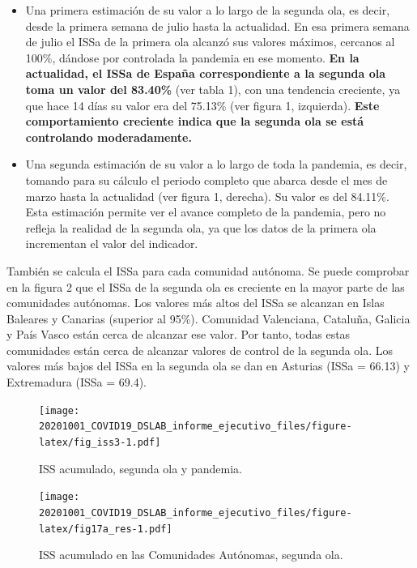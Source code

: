 \documentclass[
  11pt,
]{article}
\begin{document}
\begin{itemize}
\item
  Una primera estimación de su valor a lo largo de la segunda ola, es
  decir, desde la primera semana de julio hasta la actualidad. En esa
  primera semana de julio el ISSa de la primera ola alcanzó sus valores
  máximos, cercanos al 100\%, dándose por controlada la pandemia en ese
  momento. \textbf{En la actualidad, el ISSa de España correspondiente a
  la segunda ola toma un valor del 83.40\%} (ver tabla 1), con una
  tendencia creciente, ya que hace 14 días su valor era del 75.13\% (ver
  figura 1, izquierda). \textbf{Este comportamiento creciente indica que
  la segunda ola se está controlando moderadamente.}
\item
  Una segunda estimación de su valor a lo largo de toda la pandemia, es
  decir, tomando para su cálculo el periodo completo que abarca desde el
  mes de marzo hasta la actualidad (ver figura 1, derecha). Su valor es
  del 84.11\%. Esta estimación permite ver el avance completo de la
  pandemia, pero no refleja la realidad de la segunda ola, ya que los
  datos de la primera ola incrementan el valor del indicador.
\end{itemize}

También se calcula el ISSa para cada comunidad autónoma. Se puede
comprobar en la figura 2 que el ISSa de la segunda ola es creciente en
la mayor parte de las comunidades autónomas. Los valores más altos del
ISSa se alcanzan en Islas Baleares y Canarias (superior al 95\%).
Comunidad Valenciana, Cataluña, Galicia y País Vasco están cerca de
alcanzar ese valor. Por tanto, todas estas comunidades están cerca de
alcanzar valores de control de la segunda ola. Los valores más bajos del
ISSa en la segunda ola se dan en Asturias (ISSa = 66.13) y Extremadura
(ISSa = 69.4).

\begin{figure}
\centering
\texttt{[image: 20201001\_COVID19\_DSLAB\_informe\_ejecutivo\_files/figure-latex/fig\_iss3-1.pdf]}
\caption{\label{fig:fig_iss3} ISS acumulado, segunda ola y pandemia.}
\end{figure}

\vspace{0.2cm}

\begin{figure}
\centering
\texttt{[image: 20201001\_COVID19\_DSLAB\_informe\_ejecutivo\_files/figure-latex/fig17a\_res-1.pdf]}
\caption{\label{fig:fig17a_res} ISS acumulado en las Comunidades
Autónomas, segunda ola.}
\end{figure}
\end{document}
